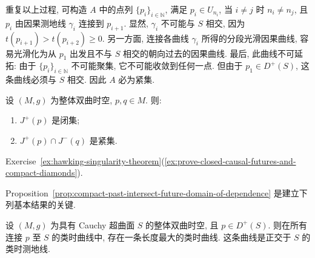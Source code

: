 \begin{RiemannProof}
重复以上过程, 可构造 $A$ 中的点列 $\{p_i\}_{i\in\mathbb{N}}$, 满足 $p_i\in U_{n_i}$, 当 $i\ne j$ 时 $n_i\ne n_j$, 且 $p_i$ 由因果测地线 $\gamma_i$ 连接到 $p_{i+1}$. 显然, $\gamma_i$ 不可能与 $S$ 相交, 因为 $t(p_{i+1})>t(p_{i+2})\geq0$. 另一方面, 连接各曲线 $\gamma_i$ 所得的分段光滑因果曲线, 容易光滑化为从 $p_1$ 出发且不与 $S$ 相交的朝向过去的因果曲线. 最后, 此曲线不可延拓: 由于 $\{p_i\}_{i\in\mathbb{N}}$ 不可能聚集, 它不可能收敛到任何一点. 但由于 $p_1\in D^+(S)$, 这条曲线必须与 $S$ 相交. 因此 $A$ 必为紧集.
\end{RiemannProof}

\begin{RiemannCorollary}\label{cor:closed-causal-futures-and-compact-diamonds}
设 $(M,g)$ 为整体双曲时空, $p,q\in M$. 则:
\begin{enumerate}[label=(\roman*),leftmargin=*]
\item $J^+(p)$ 是闭集;
\item $J^+(p)\cap J^-(q)$ 是紧集.
\end{enumerate}
\end{RiemannCorollary}

\begin{RiemannProof}
Exercise~\ref{ex:hawking-singularity-theorem}(\ref{ex:prove-closed-causal-futures-and-compact-diamonds}).
\end{RiemannProof}

Proposition~\ref{prop:compact-past-intersect-future-domain-of-dependence} 是建立下列基本结果的关键.

\begin{RiemannTheorem}\label{thm:existence-of-maximal-timelike-geodesic-from-cauchy-hypersurface}
设 $(M,g)$ 为具有 Cauchy 超曲面 $S$ 的整体双曲时空, 且 $p\in D^+(S)$. 则在所有连接 $p$ 至 $S$ 的类时曲线中, 存在一条长度最大的类时曲线. 这条曲线是正交于 $S$ 的类时测地线.
\end{RiemannTheorem}

